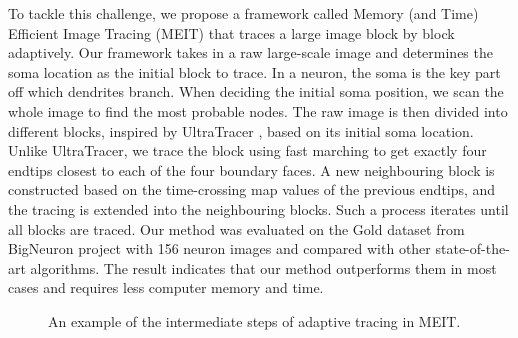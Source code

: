 \documentclass[conference]{IEEEtran}
\begin{document}
To tackle this challenge, we propose a framework called Memory (and Time) Efficient Image Tracing (MEIT) that traces a large image block by block adaptively. Our framework takes in a raw large-scale image and determines the soma location as the initial block to trace. In a neuron, the soma is the key part off which dendrites branch. When deciding the initial soma position, we scan the whole image to find the most probable nodes. The raw image is then divided into different blocks, inspired by UltraTracer \cite{ultratracer, zhou2015neuron}, based on its initial soma location. Unlike UltraTracer, we trace the block using fast marching to get exactly four endtips closest to each of the four boundary faces. A new neighbouring block is constructed based on the time-crossing map values of the previous endtips, and the tracing is extended into the neighbouring blocks. Such a process iterates until all blocks are traced. Our method was evaluated on the Gold dataset from BigNeuron project \cite{gold166} with 156 neuron images and compared with other state-of-the-art algorithms. The result indicates that our method outperforms them in most cases and requires less computer memory and time.
\begin{figure}[!tb]
\centering
    \caption{An example of the intermediate steps of adaptive tracing in MEIT.}
    \label{fig:fig1}
\end{figure}
\end{document}
